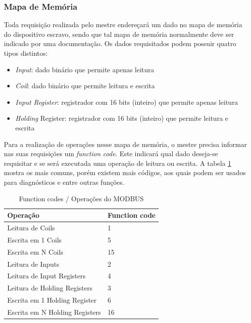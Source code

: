       \subsubsection{Mapa de Memória}

        Toda requisição realizada pelo mestre endereçará um dado no mapa de memória do dispositivo escravo, sendo que tal mapa de memória normalmente deve ser indicado por uma documentação. Os dados requisitados podem possuir quatro tipos distintos:

        \begin{itemize}
          \item \textit{Input}: dado binário que permite apenas leitura
          \item \textit{Coil}: dado binário que permite leitura e escrita
          \item \textit{Input Register}: registrador com 16 bits (inteiro) que permite apenas leitura
          \item \textit{Holding} Register: registrador com 16 bits (inteiro) que permite leitura e escrita
        \end{itemize}

        Para a realização de operações nesse mapa de memória, o mestre precisa informar nas suas requisições um \textit{function code}. Este indicará qual dado deseja-se requisitar e se será executada uma operação de leitura ou escrita. A tabela \ref{table:modbus-funccodes} mostra os mais comuns, porém existem mais códigos, aos quais podem ser usados para diagnósticos e entre outras funções.

        \begin{table}[]
          \centering
          \caption{Function codes / Operações do MODBUS}
          \label{table:modbus-funccodes}
          \begin{tabular}{@{}ll@{}}
            \toprule
            \textbf{Operação}              & \textbf{Function code} \\ \midrule
            Leitura de Coils               & 1                      \\
            Escrita em 1 Coils             & 5                      \\
            Escrita em N Coils             & 15                     \\
            Leitura de Inputs              & 2                      \\
            Leitura de Input Registers     & 4                      \\
            Leitura de Holding Registers   & 3                      \\
            Escrita em 1 Holding Register  & 6                      \\
            Escrita em N Holding Registers & 16                     \\ \bottomrule
          \end{tabular}
        \end{table}

